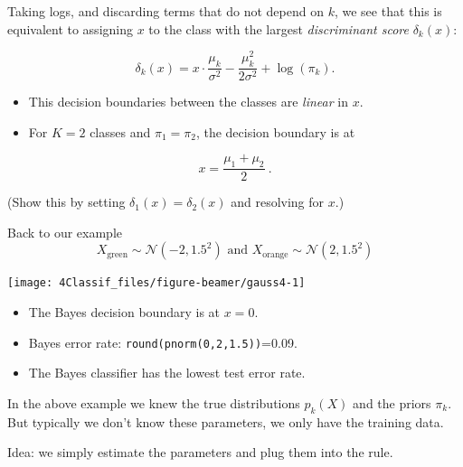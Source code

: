 \documentclass[
  10pt,
  ignorenonframetext,
]{beamer}
\begin{document}
\begin{frame}
Taking logs, and discarding terms that do not depend on \(k\), we see
that this is equivalent to assigning \(x\) to the class with the largest
\emph{discriminant score} \(\delta_k(x)\):

\[\delta_k(x) = x\cdot \frac{\mu_k}{\sigma^2} - \frac{\mu_k^2}{2 \sigma^2}+\log(\pi_k).\]

\begin{itemize}
\item
  This decision boundaries between the classes are \emph{linear} in
  \(x\).
\item
  For \(K=2\) classes and \(\pi_1=\pi_2\), the decision boundary is at
\end{itemize}

\[x = \frac{\mu_1+ \mu_2}{2} \ .\]

(Show this by setting \(\delta_1(x)=\delta_2(x)\) and resolving for
\(x\).)
\end{frame}

\begin{frame}[fragile]
\begin{block}{Back to our example}
\protect\hypertarget{back-to-our-example}{}
\[X_{\text{green}}\sim \mathcal{N}(-2, 1.5^2) \text{ and }
X_{\text{orange}}\sim \mathcal{N}(2, 1.5^2) \]

\begin{center}\texttt{[image: 4Classif\_files/figure-beamer/gauss4-1]} \end{center}

\begin{itemize}
\item
  The Bayes decision boundary is at \(x=0\).
\item
  Bayes error rate: \texttt{round(pnorm(0,2,1.5))}=0.09.
\item
  The Bayes classifier has the lowest test error rate.
\end{itemize}
\end{block}
\end{frame}

\begin{frame}
\vspace{2mm}

In the above example we knew the true distributions \(p_k(X)\) and the
priors \(\pi_k\). But typically we don't know these parameters, we only
have the training data.

Idea: we simply estimate the parameters and plug them into the rule.
\end{frame}
\end{document}
